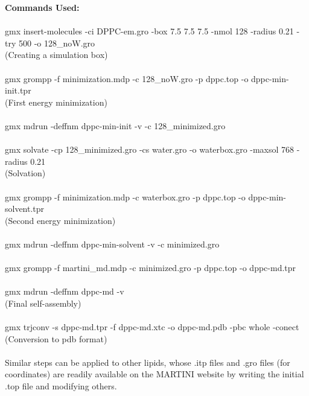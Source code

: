 \documentclass[12pt, a4paper]{report}
\begin{document}
\textbf{Commands Used:} 
\\~\\
gmx insert-molecules -ci DPPC-em.gro -box 7.5 7.5 7.5 -nmol 128 -radius 0.21 -try 500 -o 128\_noW.gro 
\\(Creating a simulation box)
\\~\\
gmx grompp -f minimization.mdp -c 128\_noW.gro -p dppc.top -o dppc-min-init.tpr 
\\(First energy minimization)
\\~\\
gmx mdrun -deffnm dppc-min-init -v -c 128\_minimized.gro 
\\~\\
gmx solvate -cp 128\_minimized.gro -cs water.gro -o waterbox.gro -maxsol 768 -radius 0.21 
\\(Solvation)
\\~\\
gmx grompp -f minimization.mdp -c waterbox.gro -p dppc.top -o dppc-min-solvent.tpr  
\\(Second energy minimization)
\\~\\
gmx mdrun -deffnm dppc-min-solvent -v -c minimized.gro \\~\\
gmx grompp -f martini\_md.mdp -c minimized.gro -p dppc.top -o dppc-md.tpr 
\\~\\
gmx mdrun -deffnm dppc-md -v 
\\(Final self-assembly)
\\~\\ 
gmx trjconv -s dppc-md.tpr -f dppc-md.xtc -o dppc-md.pdb -pbc whole -conect 
\\(Conversion to pdb format)
\\~\\
Similar steps can be applied to other lipids, whose .itp files and .gro files (for coordinates) are readily available on the MARTINI website by writing the initial .top file and modifying others. 
\\~\\~\\
\end{document}

